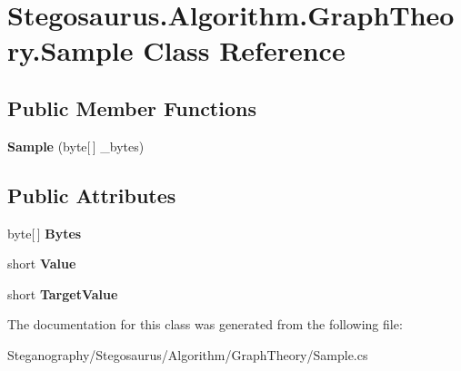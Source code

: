 \hypertarget{class_stegosaurus_1_1_algorithm_1_1_graph_theory_1_1_sample}{}\section{Stegosaurus.\+Algorithm.\+Graph\+Theory.\+Sample Class Reference}
\label{class_stegosaurus_1_1_algorithm_1_1_graph_theory_1_1_sample}
\subsection*{Public Member Functions}
\begin{DoxyCompactItemize}
\item 
{\bfseries Sample} (byte\mbox{[}$\,$\mbox{]} \+\_\+bytes)\hypertarget{class_stegosaurus_1_1_algorithm_1_1_graph_theory_1_1_sample_acf7995b54e7cc82441b14c9ed4d87335}{}\label{class_stegosaurus_1_1_algorithm_1_1_graph_theory_1_1_sample_acf7995b54e7cc82441b14c9ed4d87335}

\end{DoxyCompactItemize}
\subsection*{Public Attributes}
\begin{DoxyCompactItemize}
\item 
byte\mbox{[}$\,$\mbox{]} {\bfseries Bytes}\hypertarget{class_stegosaurus_1_1_algorithm_1_1_graph_theory_1_1_sample_aa7fb0e9e3eb6c2b8624b1185b2c730c7}{}\label{class_stegosaurus_1_1_algorithm_1_1_graph_theory_1_1_sample_aa7fb0e9e3eb6c2b8624b1185b2c730c7}

\item 
short {\bfseries Value}\hypertarget{class_stegosaurus_1_1_algorithm_1_1_graph_theory_1_1_sample_ae72ad88189265fae3073bd09a5b730fe}{}\label{class_stegosaurus_1_1_algorithm_1_1_graph_theory_1_1_sample_ae72ad88189265fae3073bd09a5b730fe}

\item 
short {\bfseries Target\+Value}\hypertarget{class_stegosaurus_1_1_algorithm_1_1_graph_theory_1_1_sample_a7d56edd7edef5ee7d2c1ef5197b45e83}{}\label{class_stegosaurus_1_1_algorithm_1_1_graph_theory_1_1_sample_a7d56edd7edef5ee7d2c1ef5197b45e83}

\end{DoxyCompactItemize}


The documentation for this class was generated from the following file\+:\begin{DoxyCompactItemize}
\item 
Steganography/\+Stegosaurus/\+Algorithm/\+Graph\+Theory/Sample.\+cs\end{DoxyCompactItemize}
